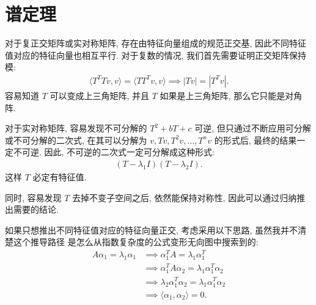 \documentclass[UTF8,a4paper,11pt]{ctexart}
\begin{document}
  \section{谱定理}
    对于复正交矩阵或实对称矩阵,
    存在由特征向量组成的规范正交基,
    因此不同特征值对应的特征向量也相互平行.
    对于复数的情况, 我们首先需要证明正交矩阵保持模:
    \[
    \begin{aligned}
      \langle T^T T v, v \rangle = \langle T T^T v, v \rangle
      \implies |Tv| = |T^Tv|
    .\end{aligned}
    \] 
    容易知道 $T$ 可以变成上三角矩阵,
    并且 $T$ 如果是上三角矩阵, 那么它只能是对角阵.

    对于实对称矩阵, 容易发现不可分解的 $T^2+bT+c$ 可逆,
    但只通过不断应用可分解或不可分解的二次式,
    在其可以分解为 $v, Tv, T^2v, \ldots, T^n v$ 的形式后,
    最终的结果一定不可逆.
    因此, 不可逆的二次式一定可分解成这种形式:
    \[
    \begin{aligned}
      (T-\lambda_1 I)(T-\lambda_2 I)
    .\end{aligned}
    \] 
    这样 $T$ 必定有特征值.

    同时, 容易发现 $T$ 去掉不变子空间之后,
    依然能保持对称性,
    因此可以通过归纳推出需要的结论.

    如果只想推出不同特征值对应的特征向量正交,
    考虑采用以下思路,
    虽然我并不清楚这个推导路径
    是怎么从指数复杂度的公式变形无向图中搜索到的:
    \[
    \begin{aligned}
      A \alpha_1=\lambda_1 \alpha_1
      &\implies \alpha_1^T A=\lambda_1 \alpha_1^T\\
      &\implies \alpha_1^T A \alpha_2=\lambda_1 \alpha_1^T \alpha_2\\
      &\implies \lambda_2 \alpha_1^T \alpha_2 = \lambda_1 \alpha_1^T \alpha_2\\
      &\implies \langle \alpha_1, \alpha_2 \rangle = 0
    .\end{aligned}
    \] 
\end{document}
